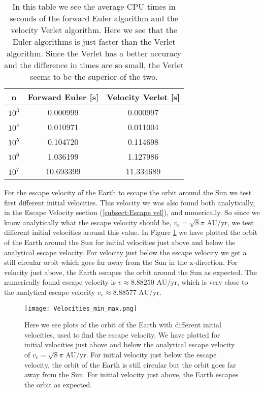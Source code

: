 \documentclass[12pt,a4paper,english]{article}
\begin{document}
\begin{table}[htbp]
	\centering
	\begin{tabular}{ |c|c|c| }
		\hline \rule{0pt}{13pt}
		n & Forward Euler [s] & Velocity Verlet [s] \\
		\hline \rule{0pt}{13pt}
		$10^3$ & 0.000999 & 0.000997  \\
		\hline \rule{0pt}{13pt}
		$10^4$ & 0.010971 & 0.011004 \\
		\hline \rule{0pt}{13pt}
		$10^5$ & 0.104720 & 0.114698 \\
		\hline \rule{0pt}{13pt}
		$10^6$ & 1.036199 & 1.127986 \\
		\hline \rule{0pt}{13pt}
		$10^7$ & 10.693399 & 11.334689 \\
		\hline 
	\end{tabular}	
	\caption{In this table we see the average CPU times in seconds of the forward Euler algorithm and the velocity Verlet algorithm. Here we see that the Euler algorithms is just faster than the Verlet algorithm. Since the Verlet has a better accuracy and the difference in times are so small, the Verlet seems to be the superior of the two.}
	\label{tab:times}
\end{table}

For the escape velocity of the Earth to escape the orbit around the Sun we test first different initial velocities. This velocity we was also found both analytically, in the Escape Velocity section (\ref{subsect:Escape vel}), and numerically. So since we know analytically what the escape velocity should be, $v_e=\sqrt{8}\pi$ AU/yr, we test different initial velocities around this value. In Figure \ref{fig:escape_vel} we have plotted the orbit of the Earth around the Sun for initial velocities just above and below the analytical escape velocity. For velocity just below the escape velocity we get a still circular orbit which goes far away from the Sun in the x-direction. For velocity just above, the Earth escapes the orbit around the Sun as expected. The numerically found escape velocity is $v\approx 8.88250$ AU/yr, which is very close to the analytical escape velocity $v_e\approx 8.88577$ AU/yr.

\begin{figure}[htbp]
	\centering\texttt{[image: Velocities\_min\_max.png]}
	\caption{Here we see plots of the orbit of the Earth with different initial velocities, used to find the escape velocity. We have plotted for initial velocities just above and below the analytical escape velocity of $v_e=\sqrt{8}\pi$ AU/yr. For initial velocity just below the escape velocity, the orbit of the Earth is still circular but the orbit goes far away from the Sun. For initial velocity just above, the Earth escapes the orbit as expected. \label{fig:escape_vel}}
\end{figure}
\end{document}
